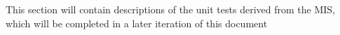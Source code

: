 \documentclass[12pt, titlepage]{article}
\begin{document}
\begin{enumerate}
This section will contain descriptions of the unit tests derived from the MIS, which will be completed in a later iteration of this document

\begin{comment}
\wss{This section should not be filled in until after the MIS (detailed design
  document) has been completed.}

\wss{Reference your MIS (detailed design document) and explain your overall
philosophy for test case selection.}  

\wss{To save space and time, it may be an option to provide less detail in this section.  
For the unit tests you can potentially layout your testing strategy here.  That is, you 
can explain how tests will be selected for each module.  For instance, your test building 
approach could be test cases for each access program, including one test for normal behaviour 
and as many tests as needed for edge cases.  Rather than create the details of the input 
and output here, you could point to the unit testing code.  For this to work, you code 
needs to be well-documented, with meaningful names for all of the tests.}

\subsection{Unit Testing Scope}

\wss{What modules are outside of the scope.  If there are modules that are
  developed by someone else, then you would say here if you aren't planning on
  verifying them.  There may also be modules that are part of your software, but
  have a lower priority for verification than others.  If this is the case,
  explain your rationale for the ranking of module importance.}

\subsection{Tests for Functional Requirements}

\wss{Most of the verification will be through automated unit testing.  If
  appropriate specific modules can be verified by a non-testing based
  technique.  That can also be documented in this section.}

\subsubsection{Module 1}

\wss{Include a blurb here to explain why the subsections below cover the module.
  References to the MIS would be good.  You will want tests from a black box
  perspective and from a white box perspective.  Explain to the reader how the
  tests were selected.}


\end{comment}
\end{enumerate}
\end{document}

